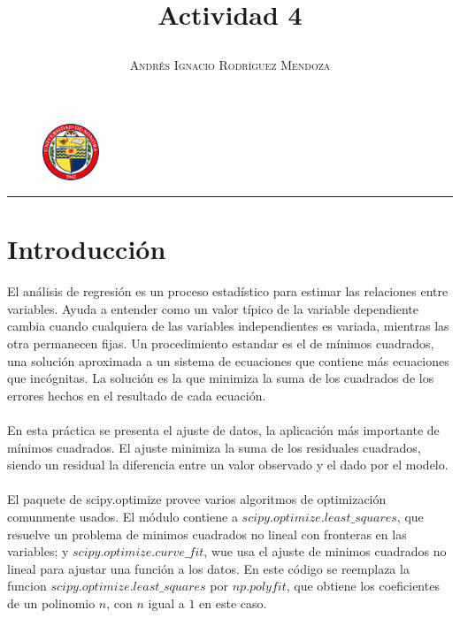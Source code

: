 \documentclass[11pt,spanish]{article}
\title{\vspace{-3cm}\begin{flushleft}\textbf{Actividad 4}\end{flushleft}}
\author{\hspace{-9.6cm}\textsc{Andrés Ignacio Rodríguez Mendoza}}
\date{}
\begin{document}
\begin{figure}
  \begin{center}
   \vspace{-5.4cm} \includegraphics[width=0.15\textwidth]{uni}
  \end{center}
\end{figure}

\maketitle  
\begin{center}
\rule{\textwidth}{1pt}
\end{center}
\section*{Introducción}

El análisis de regresión es un proceso estadístico para estimar las relaciones entre variables. Ayuda a entender como un valor típico de la variable dependiente cambia cuando cualquiera de las variables independientes es variada, mientras las otra permanecen fijas. Un procedimiento estandar es el de mínimos cuadrados, una solución aproximada a un sistema de ecuaciones que contiene más ecuaciones que incógnitas. La solución es la que minimiza la suma de los cuadrados de los errores hechos en el resultado de cada ecuación.\\ \\
En esta práctica se presenta el ajuste de datos, la aplicación más importante de mínimos cuadrados. El ajuste minimiza la suma de los residuales cuadrados, siendo un residual la diferencia entre un valor observado y el dado por el modelo.\\ \\
El paquete de scipy.optimize provee varios algoritmos de optimización comunmente usados. El módulo contiene a $scipy.optimize.least\_squares$, que resuelve un problema de minimos cuadrados no lineal con fronteras en las variables; y $scipy.optimize.curve\_fit$, wue usa el ajuste de minimos cuadrados no lineal para ajustar una función a los datos. En este código se reemplaza la funcion $scipy.optimize.least\_squares$ por $np.polyfit$, que obtiene los coeficientes de un polinomio $n$, con $n$ igual a $1$ en este caso.
\end{document}
